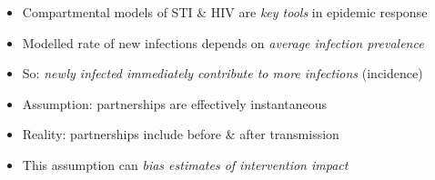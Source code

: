 \begin{itemize}
  \item Compartmental models of STI \& HIV are \emph{key tools} in epidemic response \cite{1}
  \item Modelled rate of new infections depends on \emph{average infection prevalence}
  \item So: \emph{newly infected immediately contribute to more infections} (incidence)
  \item Assumption: partnerships are effectively instantaneous \cite{2}
  \item Reality: partnerships include before \& after transmission
  \item This assumption can \emph{bias estimates of intervention impact} \cite{3}
  \hfill\smash{\raisebox{0pt}{}}
\end{itemize}

